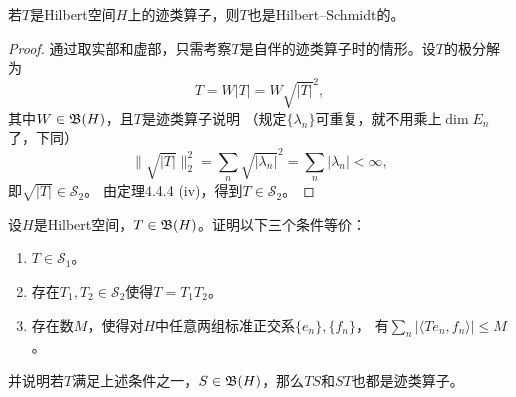 \begin{5}
    若$T$是Hilbert空间$H$上的迹类算子，则$T$也是Hilbert--Schmidt的。
\end{5}
\begin{proof}
    通过取实部和虚部，只需考察$T$是自伴的迹类算子时的情形。设$T$的极分解为
    \[T=W|T|=W\!\sqrt{|T|}^2,\]
    其中$W\in\mathfrak{B}(H)$，且$T$是迹类算子说明
    （规定$\{\lambda_n\}$可重复，就不用乘上$\dim E_n$了，下同）
    \[\big\|\sqrt{|T|}\big\|_2^2=\sum_n\sqrt{|\lambda_n|}^2
    =\sum_n|\lambda_n|<\infty,\]
    即$\sqrt{|T|}\in\mathcal{S}_2$。
    由定理4.4.4 (iv)，得到$T\in\mathcal{S}_2$。
\end{proof}

\begin{6}
    设$H$是Hilbert空间，$T\in\mathfrak{B}(H)$。证明以下三个条件等价：
    \begin{enumerate}[label=(\roman*)]
    \item $T\in\mathcal{S}_1$。
    \item 存在$T_1,T_2\in\mathcal{S}_2$使得$T=T_1T_2$。
    \item 存在数$M$，使得对$H$中任意两组标准正交系$\{e_n\},\{f_n\}$，
    有$\displaystyle\sum_n|\langle Te_n,f_n \rangle| \leqslant M$。
    \end{enumerate}
    并说明若$T$满足上述条件之一，$S\in\mathfrak{B}(H)$，那么$TS$和$ST$也都是迹类算子。
\end{6}
